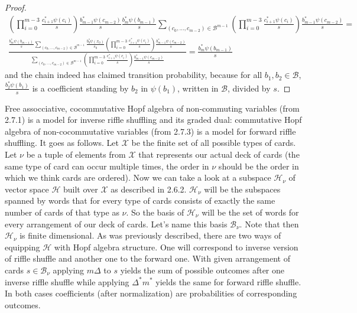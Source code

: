 \documentclass[a4paper, 12pt]{article}
\newcommand{\ndotsm}[3]{{#1}_{#2}, \dots, {#1}_{#3}}
\begin{document}
\begin{proof}
\begin{gather*}
{\left(\displaystyle\prod_{i = 0}^{m-3}\frac{c_{i+1}^*\psi(c_i)}{s}\right)\frac{b_{m-1}^*\psi(c_{m-2})}{s}
\frac{b_m^*\psi(b_{m-1})}{s}}{\displaystyle\sum_{(\ndotsm{c}{0}{m-2}) \in \mathcal{B}^{m-1}}
\left(\prod_{i= 0}^{m-3}\frac{c_{i+1}^*
\psi(c_i)}{s}\right)\frac{b_{m-1}^*\psi(c_{m-2})}{s}} = \\[16pt]
\frac{\frac{b_m^*\psi(b_{m-1})}{s}\displaystyle\sum_{(c_0, \dots, c_{m-2}) \in \mathcal{B}^{m-1}}
\frac{b_0^*\psi(x_0)}{s_0}
\left(\displaystyle\prod_{i = 0}^{m-3}\frac{c_{i+1}^*\psi(c_i)}{s}\right)\frac{b_{m-1}^*\psi(c_{m-2})}{s}}
{\displaystyle\sum_{(\ndotsm{c}{0}{m-2}) \in \mathcal{B}^{m-1}}\left(\prod_{i= 0}^{m-3}\frac{c_{i+1}^*
\psi(c_i)}{s}\right)\frac{b_{m-1}^*\psi(c_{m-2})}{s}} = \frac{b_m^*\psi(b_{m-1})}{s}
\end{gather*}
and the chain indeed has claimed transition probability, because for all $b_1, b_2 \in \mathcal{B}$,
 $\frac{b_2^*\psi(b_1)}{s}$ is a coefficient
standing by $b_2$ in $\psi(b_1)$, written in $\mathcal{B}$, divided by $s$.
\end{proof}

Free assocciative, cocommutative Hopf algebra of non-commuting variables (from 2.7.1) is a model for inverse
riffle shuffling and its graded dual: commutative
Hopf algebra of non-cocommutative variables (from 2.7.3) is a model for forward riffle shuffling.
It goes as follows.
Let $\mathcal{X}$ be the finite set of all possible types of cards. Let $\nu$ be a tuple of
elements from $\mathcal{X}$ that represents our actual deck of cards (the same type of card can occur
multiple times, the order in $\nu$ should be the order in which we think cards are ordered). Now we can
take a look at a subspace $\mathcal{H}_\nu$ of vector space $\mathcal{H}$ built over $\mathcal{X}$ as
described in 2.6.2. $\mathcal{H}_\nu$ will be the subspaces spanned by words that for every type of cards
consists of exactly the same number of cards of that type as $\nu$. So the basis of $\mathcal{H}_\nu$ will
be the set
of words for every arrangement of our deck of cards. Let's name this basis $\mathcal{B}_\nu$. Note that then
$\mathcal{H}_\nu$ is finite dimensional. As was previously described, there are two ways of equipping
$\mathcal{H}$ with Hopf algebra structure. One will correspond to inverse version of riffle shuffle and
another one to the forward one. With given arrangement of cards $s \in \mathcal{B}_\nu$ applying $m\Delta$ to
$s$ yields the sum of possible outcomes after one inverse riffle shuffle while applying $\Delta^*m^*$
yields the same for forward riffle shuffle. In both cases coefficients (after normalization) are
probabilities of corresponding outcomes. \\[4pt]
\end{document}
